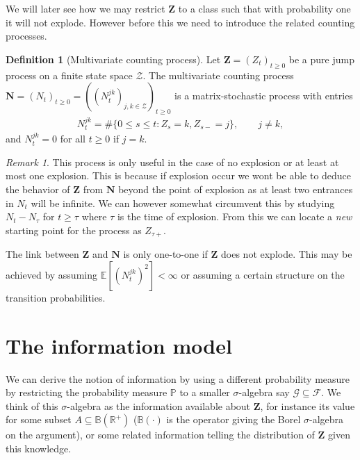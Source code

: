 \documentclass[12pt,letter,twoside]{article}
\theoremstyle{plain}
\theoremstyle{definition}
\newtheorem{definition}[theorem]{Definition}
\theoremstyle{remark}
\newtheorem*{remark}{Remark}
\begin{document}
We will later see how we may restrict $\mathbf Z$ to a class such that with probability one it will not explode. However before this we need to introduce the related counting processes.
\begin{definition}[Multivariate counting process]
Let $\mathbf Z=(Z_t)_{t\ge0}$ be a pure jump process on a finite state space $\mathcal Z$. The multivariate counting process $\mathbf N = (N_t)_{t\ge 0}=((N^{jk}_t)_{j,k\in\mathcal Z})_{t\ge 0}$ is a matrix-stochastic process with entries
\begin{align}
N^{jk}_t=\#\big\{0\le s\le t : Z_s= k, Z_{s-}=j\big\},\qquad j\ne k,
\end{align}
and $N^{jk}_t=0$ for all $t\ge 0$ if $j=k$.
\end{definition}
\begin{remark}
This process is only useful in the case of no explosion or at least at most one explosion. This is because if explosion occur we wont be able to deduce the behavior of $\mathbf Z$ from $\mathbf N$ beyond the point of explosion as at least two entrances in $N_t$ will be infinite. We can however somewhat circumvent this by studying $N_t-N_\tau$ for $t\ge \tau$ where $\tau$ is the time of explosion. From this we can locate a \textit{new} starting point for the process as $Z_{\tau+}$.
\end{remark}
The link between $\mathbf Z$ and $\mathbf N$ is only one-to-one if $\mathbf Z$ does not explode. This may be achieved by assuming $\mathbb E[(N^{jk}_t)^2]<\infty$ or assuming a certain structure on the transition probabilities.

\section{The information model}\label{sec:info}
We can derive the notion of information by using a different probability measure by restricting the probability measure $\mathbb P$ to a smaller $\sigma$-algebra say $\mathcal G\subseteq \mathcal F$. We think of this $\sigma$-algebra as the information available about $\mathbf Z$, for instance its value for some subset $A\subseteq \mathbb B(\mathbb R^+)$ ($\mathbb B(\cdot)$ is the operator giving the Borel $\sigma$-algebra on the argument), or some related information telling the distribution of $\mathbf Z$ given this knowledge.
\end{document}
